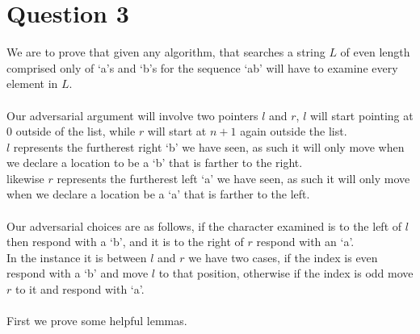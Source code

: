 \documentclass{article}
\begin{document}
  \section{Question 3}
    We are to prove that given any algorithm, that searches a string $L$ of even length comprised only of `a's and `b's for the sequence `ab' will have to examine every element in $L$. \\
    \\
    Our adversarial argument will involve two pointers $l$ and $r$, $l$ will start pointing at $0$ outside of the list, while $r$ will start at $n + 1$ again outside the list. \\
    $l$ represents the furtherest right `b' we have seen, as such it will only move when we declare a location to be a `b' that is farther to the right.\\
    likewise $r$ represents the furtherest left `a' we have seen, as such it will only move when we declare a location be a `a' that is farther to the left.\\
    \\
    Our adversarial choices are as follows, if the character examined is to the left of $l$ then respond with a `b', and it is to the right of $r$ respond with an `a'. \\
    In the instance it is between $l$ and $r$ we have two cases, if the index is even respond with a `b' and move $l$ to that position, otherwise if the index is odd move $r$ to it and respond with `a'.\\
    \\
    First we prove some helpful lemmas.
\end{document}
